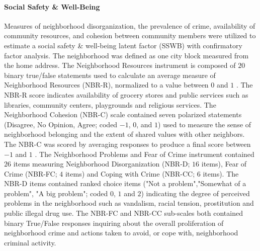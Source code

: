 \documentclass[utf8]{frontiersSCNS} %
\begin{document}
\paragraph{Social Safety \& Well-Being}
Measures of neighborhood disorganization, the prevalence of crime, availability of community resources, and cohesion between community members were utilized to estimate a social safety \& well-being latent factor (SSWB) with confirmatory factor analysis. The neighborhood was defined as one city block measured from the home address. The Neighborhood Resources instrument is composed of $20$ binary true/false statements used to calculate an average measure of Neighborhood Resources (NBR-R), normalized to a value between $0$ and $1$ \citep{tolan2001chicago}. The NBR-R score indicates availability of grocery stores and public services such as libraries, community centers, playgrounds and religious services. The Neighborhood Cohesion (NBR-C) scale contained seven polarized statements (Disagree, No Opinion, Agree; coded $-1$, $0$, and $1$) used to measure the sense of neighborhood belonging and the extent of shared values with other neighbors. The NBR-C was scored by averaging responses to produce a final score between $-1$ and $1$ \citep{perkins1990participation}. The Neighborhood Problems and Fear of Crime instrument contained $26$ items measuring Neighborhood Disorganization (NBR-D; $16$ items), Fear of Crime (NBR-FC; $4$ items) and Coping with Crime (NBR-CC; $6$ items). The NBR-D items contained ranked choice items ("Not a problem","Somewhat of a problem", "A big problem"; coded $0$, $1$ and $2$) indicating the degree of perceived problems in the neighborhood such as vandalism, racial tension, prostitution and public illegal drug use. The NBR-FC and NBR-CC sub-scales both contained binary True/False responses inquiring about the overall proliferation of neighborhood crime and actions taken to avoid, or cope with, neighborhood criminal activity. 
\end{document}
